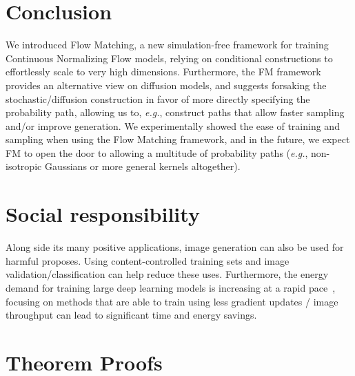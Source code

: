 \documentclass{article}
\makeatletter
\newcommand{\eg}{{e.g.}}
\renewcommand*{\eg}{{\it e.g.}\@\xspace}
\makeatother
\begin{document}
\section{Conclusion}\vspace{-3pt}
We introduced Flow Matching, a new simulation-free framework for training Continuous Normalizing Flow models, relying on conditional constructions to effortlessly scale to very high dimensions.
Furthermore, the FM framework provides an alternative view on diffusion models, and suggests forsaking the stochastic/diffusion construction in favor of more directly specifying the probability path, allowing us to, \eg, construct paths that allow faster sampling and/or improve generation.
We experimentally showed the ease of training and sampling when using the Flow Matching framework, and in the future, we expect FM to open the door to allowing a multitude of probability paths (\eg, non-isotropic Gaussians or more general kernels altogether). 

\newpage

\section{Social responsibility}
Along side its many positive applications, image generation can also be used for harmful proposes. Using content-controlled training sets and image validation/classification can help reduce these uses. Furthermore, the energy demand for training large deep learning models is increasing at a rapid pace~\citep{openaiandcompute,thompson2020computational}, focusing on methods that are able to train using less gradient updates / image throughput can lead to significant time and energy savings. 






\newpage 
\appendix

\section{Theorem Proofs}
\label{A:proofs}
\end{document}
